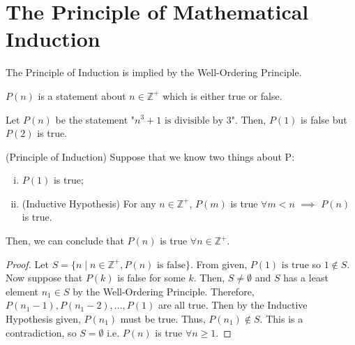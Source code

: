 \documentclass{article}
\begin{document}
\section{The Principle of Mathematical Induction}
The Principle of Induction is implied by the Well-Ordering Principle. 
\begin{definition}
$P(n)$ is a statement about $n\in\mathbb{Z}^+$ which is either true or false.
\end{definition}
\begin{example}
Let $P(n)$ be the statement "$n^3+1 \mbox{ is divisible by } 3$". Then, $P(1)$ is false but $P(2)$ is true.  
\end{example}
\begin{theorem}
(Principle of Induction) Suppose that we know two things about P: 
\begin{enumerate}[(i)]
	\item $P(1)$ is true;
	\item (Inductive Hypothesis) For any $n\in\mathbb{Z}^+$, $P(m)$ is true $\forall m<n$ $\implies$ $P(n)$ is true. 
\end{enumerate}
Then, we can conclude that $P(n)$ is true $\forall n\in\mathbb{Z}^+$.
\end{theorem}
\begin{proof}
Let $S=\{n\mid n\in\mathbb{Z}^+, P(n) \mbox{ is false}\}$. From given, $P(1) \mbox{ is true} $ so $1\notin S$. Now suppose that $P(k)$ is false for some $k$. Then, $S\neq\emptyset$ and $S$ has a least element $n_1\in S$ by the Well-Ordering Principle. Therefore, $P(n_1-1),P(n_1-2),\dots,P(1)$ are all true. Then by the Inductive Hypothesis given, $P(n_1)$ must be true. Thus, $P(n_1) \notin S$. This is a contradiction, so $S=\emptyset$ i.e. $P(n)$ is true $\forall n \geq 1$. 
\end{proof}
\end{document}
